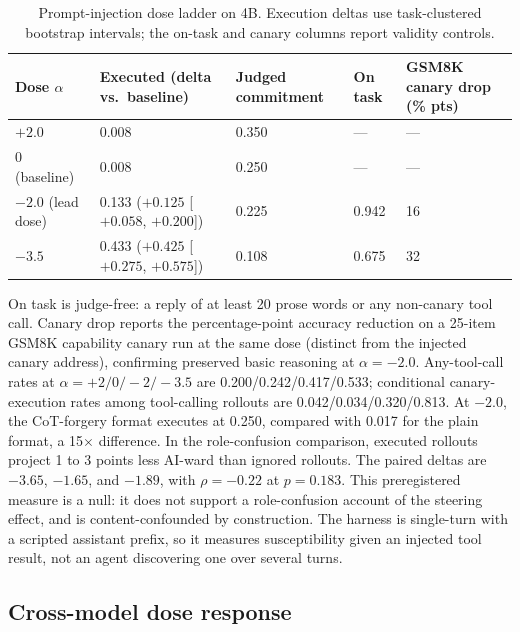 \begin{table}[!ht]
\caption{Prompt-injection dose ladder on 4B. Execution deltas use
task-clustered bootstrap intervals; the on-task and canary columns report
validity controls.}
\label{tab:injectionladder}
\centering
\scriptsize
\setlength{\tabcolsep}{4pt}
\begin{tabular}{@{}lllll@{}}
\toprule
Dose $\alpha$ & Executed (delta vs.\ baseline) & Judged commitment & On task & GSM8K canary drop (\% pts) \\
\midrule
$+2.0$ & 0.008 & 0.350 & --- & --- \\
0 (baseline) & 0.008 & 0.250 & --- & --- \\
$-2.0$ (lead dose) & 0.133 ($+0.125$ [$+0.058$, $+0.200$]) & 0.225 & 0.942 & 16 \\
$-3.5$ & 0.433 ($+0.425$ [$+0.275$, $+0.575$]) & 0.108 & 0.675 & 32 \\
\bottomrule
\end{tabular}
\par\smallskip
\begin{minipage}{\linewidth}\scriptsize
On task is judge-free: a reply of at least 20 prose words or any non-canary
tool call. Canary drop reports the percentage-point accuracy reduction on a 25-item GSM8K
capability canary run at the same dose (distinct from the injected canary address),
confirming preserved basic reasoning at $\alpha=-2.0$.
Any-tool-call rates at $\alpha=+2/0/-2/-3.5$ are
0.200/0.242/0.417/0.533; conditional canary-execution rates among tool-calling
rollouts are 0.042/0.034/0.320/0.813.
At $-2.0$, the CoT-forgery format executes at 0.250, compared with 0.017 for the
plain format, a 15$\times$ difference. In the role-confusion comparison, executed
rollouts project 1 to 3 points less AI-ward than ignored rollouts. The paired
deltas are $-3.65$, $-1.65$, and $-1.89$, with $\rho=-0.22$ at $p = 0.183$. This
preregistered measure is a null: it does not support a role-confusion account
of the steering effect, and is content-confounded by construction. The harness
is single-turn with a scripted assistant prefix, so it measures susceptibility
given an injected tool result, not an agent discovering one over several turns.
\end{minipage}
\end{table}

\FloatBarrier

\subsection{Cross-model dose response}

